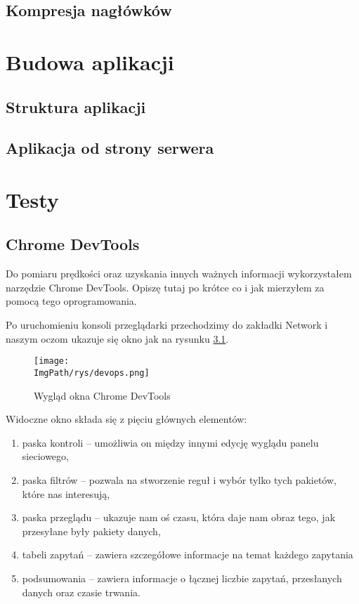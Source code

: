 \documentclass[a4paper,12pt,twoside,openany]{report}
\newcommand{\ImgPath}{.}
\begin{document}
\section{Kompresja nagłówków}

\chapter{Budowa aplikacji}

\section{Struktura aplikacji}
\section{Aplikacja od strony serwera}


\chapter{Testy}

\section{Chrome DevTools}

Do pomiaru prędkości oraz uzyskania innych ważnych informacji wykorzystałem narzędzie Chrome DevTools.
Opiszę tutaj po krótce co i jak mierzyłem za pomocą tego oprogramowania.

Po uruchomieniu konsoli przeglądarki przechodzimy do zakładki Network i naszym oczom ukazuje się okno jak na rysunku \ref{schematDevops}.

\begin{figure}[!htbp]
	\begin{center}
\centering
\texttt{[image: \\ImgPath/rys/devops.png]}
\end{center}
	\caption{Wygląd okna Chrome DevTools}
	\label{schematDevops}
\end{figure}

Widoczne okno składa się z pięciu głównych elementów:
\begin{enumerate}
	\item paska kontroli -- umożliwia on między innymi edycję wyglądu panelu sieciowego,
	\item paska filtrów -- pozwala na stworzenie reguł i wybór tylko tych pakietów, które nas interesują,
	\item paska przeglądu -- ukazuje nam oś czasu, która daje nam obraz tego, jak przesyłane były pakiety danych,
	\item tabeli zapytań -- zawiera szczegółowe informacje na temat każdego zapytania
	\item podsumowania -- zawiera informacje o łącznej liczbie zapytań, przesłanych danych oraz czasie trwania.
\end{enumerate}
\end{document}
